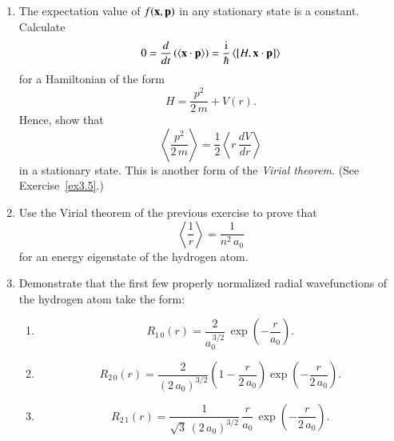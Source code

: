 \begin{enumerate}[label=\thechapter.\arabic*,leftmargin=*,widest=9.20]
\item The expectation value of $f({\bf x},{\bf p})$ in any stationary state is a constant.
Calculate
$$
0= \frac{d}{dt}\,(\langle{\bf x}\cdot{\bf p}\rangle) = \frac{{\rm i}}{\hbar}\,\langle[H, {\bf x}\cdot{\bf p}]\rangle
$$
for a Hamiltonian of the form
$$
H = \frac{p^2}{2\,m} + V(r).
$$
Hence, show that
$$
\left\langle\frac{p^2}{2\,m}\right\rangle = \frac{1}{2}\left\langle r\,\frac{dV}{dr}\right\rangle
$$
in a stationary state. This is another form of the {\em Virial theorem}. (See Exercise~\ref{ex3.5}.)

\item Use the Virial theorem of the previous exercise to prove that
$$
\left\langle \frac{1}{r}\right\rangle = \frac{1}{n^2\,a_0}
$$
for an energy eigenstate of the hydrogen atom. 

\item Demonstrate that the  first few properly normalized radial wavefunctions of the hydrogen atom take the form:
\begin{enumerate}
\item 
$$
R_{1\,0}(r) = \frac{2}{a_0^{\,3/2}}\,\exp\left(-\frac{r}{a_0}\right).
$$
\item
$$
R_{2\,0}(r)= \frac{2}{(2\,a_0)^{3/2}}\left(1-\frac{r}{2\,a_0}\right)\exp\left(-\frac{r}{2\,a_0}\right).
$$
\item
$$
R_{2\,1}(r)= \frac{1}{\sqrt{3}\,(2\,a_0)^{3/2}}\,\frac{r}{a_0}\,\exp\left(-\frac{r}{2\,a_0}\right).
$$
\end{enumerate}
\end{enumerate}
